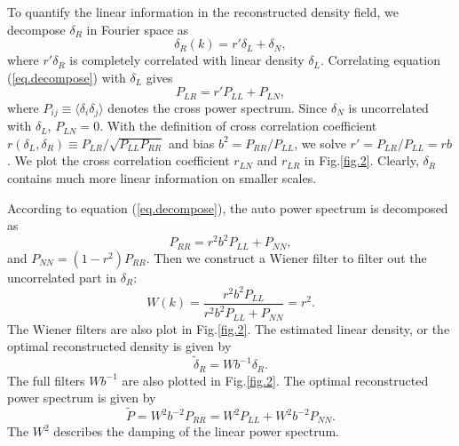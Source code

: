 \documentclass[aps,prd,twocolumn,superscriptaddress,amsfont,amssymb,amsmath,nofootinbib,showpacs,balancelastpage]{revtex4-1}
\begin{document}
To quantify the linear information in the reconstructed density field, we decompose $\delta_R$ in Fourier space as
\begin{equation}\label{eq.decompose}
    \delta_R(k)=r'\delta_L+\delta_N,
\end{equation}
where $r'\delta_R$ is completely correlated with linear density $\delta_L$. Correlating equation (\ref{eq.decompose}) with $\delta_L$ gives
\begin{equation}
    P_{LR}=r'P_{LL}+P_{LN},
\end{equation}
where $P_{ij}\equiv\langle\delta_i\delta_j\rangle$ denotes the cross power 
spectrum. Since $\delta_N$ is uncorrelated with $\delta_L$, $P_{LN}=0$. With the 
definition of cross correlation coefficient $r(\delta_L,\delta_R)\equiv P_{LR}/\sqrt{P_{LL}P_{RR}}$ 
and bias $b^2=P_{RR}/P_{LL}$, we solve $r'=P_{LR}/P_{LL}=rb$. We plot the cross 
correlation coefficient $r_{LN}$ and $r_{LR}$ in Fig.\ref{fig.2}. Clearly, $
\delta_R$ contains much more linear information on smaller scales.

According to equation (\ref{eq.decompose}), the auto power spectrum is decomposed as
\begin{equation}
    P_{RR}=r^2b^2P_{LL}+P_{NN},
\end{equation}
and $P_{NN}=(1-r^2)P_{RR}$. Then we construct a Wiener filter to filter out the uncorrelated part in $\delta_R$:
\begin{equation}
    W(k)=\frac{r^2b^2P_{LL}}{r^2b^2P_{LL}+P_{NN}}=r^2.
\end{equation}
The Wiener filters are also plot in Fig.\ref{fig.2}. The estimated linear density, or the optimal reconstructed density is given by
\begin{equation}
    \tilde\delta_R=Wb^{-1}\delta_R.
\end{equation}
The full filters $Wb^{-1}$ are also plotted in Fig.\ref{fig.2}. The optimal reconstructed power spectrum is given by
\begin{equation}
    \tilde P=W^2b^{-2}P_{RR}=W^2P_{LL}+W^2b^{-2}P_{NN}.
\end{equation}
The $W^2$ describes the damping of the linear power spectrum.
\end{document}
